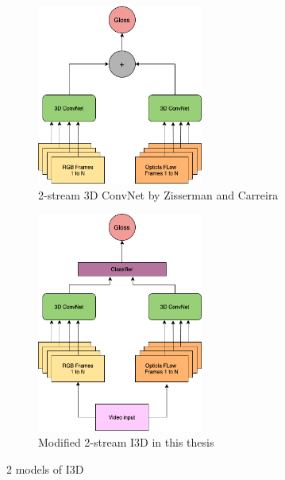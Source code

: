 \documentclass[a4paper, 12pt]{article}
\begin{document}
\begin{figure}[H]
    \centering
    \begin{subfigure}{0.4\textwidth}
        \centering
        \includegraphics[width=0.6\textwidth]{2-stream I3D Model.png}
        \caption{2-stream 3D ConvNet by Zisserman and Carreira \citep{carreira2017quo}}
        \label{Figure 7.a}
    \end{subfigure}
    \hfill
    \begin{subfigure}{0.4\textwidth}
        \centering
        \includegraphics[width=0.6\textwidth]{Modified 2-stream I3D Model.png}
        \caption{Modified 2-stream I3D in this thesis}
        \label{Figure 7.b}
    \end{subfigure}
    \caption{2 models of I3D}
    \label{Figure 7}
\end{figure}
\end{document}
